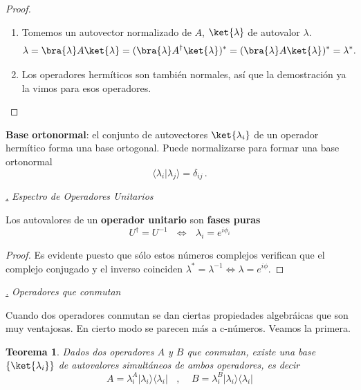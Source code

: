 \documentclass[a4paper,11pt]{book} %
\newtheorem{teorema_contador}{Teorema}
\newcommand{\Teorema}[1]{
		\begin{mybox_gray2}{}
			\begin{teorema_contador}
				 #1 
			\end{teorema_contador} 
		\end{mybox_gray2}
	}
\numberwithin{equation}{chapter}
\newcommand{\braket}[2]{\langle #1|#2\rangle}
\newcommand{\ketbra}[2]{| #1\rangle \! \langle #2|}
\def\subsubiContadorIt{\par\addtocounter{subsubsection}{1}\underline{\it\thesubsubsection.}\hskip0.5cm \setcounter{subsubsubsectionIt}{0}}
\newcommand{\SubsubiIt}[1]{
		\subsubiContadorIt \textit{#1}
	}
\newcounter{subsubsubsectionIt}[subsubsection]
\begin{document}
\begin{proof}
\begin{enumerate}
	\item Tomemos un autovector normalizado de $A$, $\ket{\lambda}$ de autovalor $\lambda$.
$$
\lambda = \bra{\lambda}A\ket{\lambda} =  (\bra{\lambda}A^\dagger\ket{\lambda})^* = (\bra{\lambda}A\ket{\lambda})^*= \lambda^* .~~~
$$   

	\item Los operadores hermíticos son también normales, así que la demostración ya la vimos para esos operadores.
\end{enumerate}
\end{proof}

\textbf{Base ortonormal}: el conjunto de autovectores $\ket{\lambda_i}$ de un operador hermítico forma una base ortogonal. Puede normalizarse para formar una base ortonormal
	\begin{equation} \label{ec_op_hermitico_autovec_ortonorm}
	\braket{\lambda_i}{\lambda_j} = \delta_{ij} \, .
	\end{equation}


			\SubsubiIt{Espectro de Operadores Unitarios}

\begin{mybox_gray2}{}

Los autovalores de un \textbf{operador unitario} son \textbf{fases puras}
$$
U^\dagger = U^{-1} ~~~\Longleftrightarrow ~~~\lambda_i = e^{i\phi_i}
$$ 
\end{mybox_gray2}


\begin{proof}
Es evidente puesto que sólo estos números complejos verifican que el complejo conjugado y el inverso coinciden $\lambda^* = \lambda^{-1} \Leftrightarrow \lambda = e^{i\phi}$. 
\end{proof}



			\SubsubiIt{Operadores que conmutan}

Cuando dos operadores conmutan se dan ciertas propiedades algebráicas que son muy ventajosas. En cierto modo se parecen más a c-números. Veamos la primera.

	\Teorema{
	Dados dos operadores $A$ y $B$ que conmutan, existe una base $\{\ket{\lambda_i}\}$ de autovalores simultáneos de ambos operadores, es decir 
	$$
	A = \lambda_i^A\ketbra{\lambda_i}{\lambda_i} ~~~~,~~~~~ B= \lambda_i^B\ketbra{\lambda_i}{\lambda_i} 
	$$
	}
\end{document}
